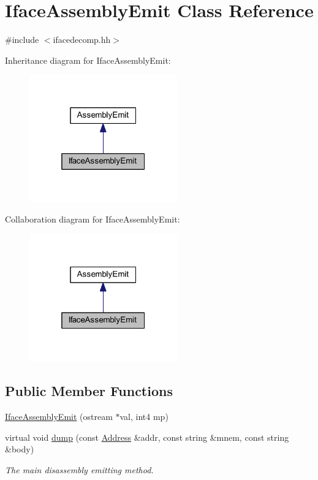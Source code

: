 \hypertarget{class_iface_assembly_emit}{}\section{Iface\+Assembly\+Emit Class Reference}
\label{class_iface_assembly_emit}


{\ttfamily \#include $<$ifacedecomp.\+hh$>$}



Inheritance diagram for Iface\+Assembly\+Emit\+:
\nopagebreak
\begin{figure}[H]
\begin{center}
\leavevmode
\includegraphics[width=181pt]{class_iface_assembly_emit__inherit__graph}
\end{center}
\end{figure}


Collaboration diagram for Iface\+Assembly\+Emit\+:
\nopagebreak
\begin{figure}[H]
\begin{center}
\leavevmode
\includegraphics[width=181pt]{class_iface_assembly_emit__coll__graph}
\end{center}
\end{figure}
\subsection*{Public Member Functions}
\begin{DoxyCompactItemize}
\item 
\mbox{\hyperlink{class_iface_assembly_emit_a94de5aaefab18cfb549437be4b5d356b}{Iface\+Assembly\+Emit}} (ostream $\ast$val, int4 mp)
\item 
virtual void \mbox{\hyperlink{class_iface_assembly_emit_abacb06a4f3972d21d3c93c5d5a170f73}{dump}} (const \mbox{\hyperlink{class_address}{Address}} \&addr, const string \&mnem, const string \&body)
\begin{DoxyCompactList}\small\item\em The main disassembly emitting method. \end{DoxyCompactList}\end{DoxyCompactItemize}


